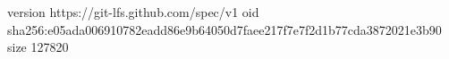 version https://git-lfs.github.com/spec/v1
oid sha256:e05ada006910782eadd86e9b64050d7faee217f7e7f2d1b77cda3872021e3b90
size 127820
